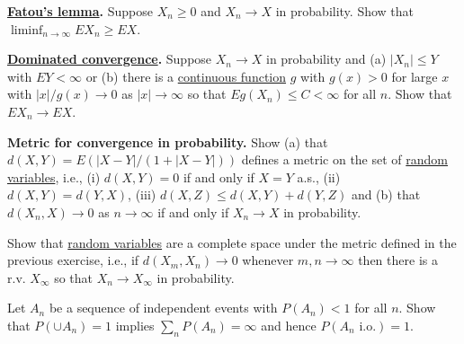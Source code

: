   \begin{exercise}[Durrett 2.3.4]
    \textbf{\hyperref[mt-thm:fatous-lemma]{Fatou's lemma}.} Suppose $X_n \geq 0$ and $X_n \to X$ in probability. Show that $\liminf_{n \to \infty} EX_n \geq EX$.
  \end{exercise}
  \begin{solution}

  \end{solution}

  \begin{exercise}[Durrett 2.3.5]
    \textbf{\hyperref[mt-thm:dominated-convergence-theorem]{Dominated convergence}.} Suppose $X_n \to X$ in probability and (a) $|X_n| \leq Y$ with $EY < \infty$ or (b) there is a \hyperref[pst-def:continuous_func]{continuous function} $g$ with $g(x) > 0$ for large $x$ with $|x|/g(x) \to 0$ as $|x| \to \infty$ so that $Eg(X_n) \leq C < \infty$ for all $n$. Show that $EX_n \to EX$.
  \end{exercise}
  \begin{solution}

  \end{solution}

  \begin{exercise}[Durrett 2.3.6]
    \textbf{Metric for convergence in probability.} Show (a) that $d(X, Y) = E(|X - Y|/(1 + |X - Y|))$ defines a metric on the set of \hyperref[def:random-variable]{random variables}, i.e., (i) $d(X, Y) = 0$ if and only if $X = Y$ a.s., (ii) $d(X, Y) = d(Y, X)$, (iii) $d(X, Z) \leq d(X, Y) + d(Y, Z)$ and (b) that $d(X_n, X) \to 0$ as $n \to \infty$ if and only if $X_n \to X$ in probability.
  \end{exercise}
  \begin{solution}

  \end{solution}

  \begin{exercise}[Durrett 2.3.7]
    Show that \hyperref[def:random-variable]{random variables} are a complete space under the metric defined in the previous exercise, i.e., if $d(X_m, X_n) \to 0$ whenever $m, n \to \infty$ then there is a r.v. $X_{\infty}$ so that $X_n \to X_{\infty}$ in probability.
  \end{exercise}
  \begin{solution}

  \end{solution}

  \begin{exercise}[Durrett 2.3.8]
    Let $A_n$ be a sequence of independent events with $P(A_n) < 1$ for all $n$. Show that $P(\cup A_n) = 1$ implies $\sum_n P(A_n) = \infty$ and hence $P(A_n \text{ i.o.}) = 1$.
  \end{exercise}
  \begin{solution}

  \end{solution}

